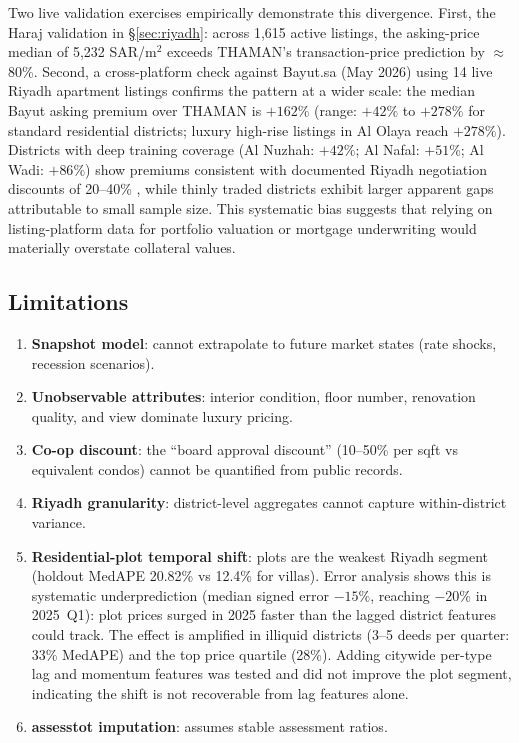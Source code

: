 \documentclass[11pt, a4paper, twoside]{article}
\begin{document}
Two live validation exercises empirically demonstrate this divergence.
First, the Haraj validation in \S\ref{sec:riyadh}: across 1,615 active
listings, the asking-price median of 5,232 SAR/m$^2$ exceeds THAMAN's
transaction-price prediction by $\approx$80\%.
Second, a cross-platform check against Bayut.sa (May 2026) using 14 live
Riyadh apartment listings confirms the pattern at a wider scale: the median
Bayut asking premium over THAMAN is $+162\%$ (range: $+42\%$ to $+278\%$
for standard residential districts; luxury high-rise listings in Al Olaya
reach $+278\%$). Districts with deep training coverage
(Al Nuzhah: $+42\%$; Al Nafal: $+51\%$; Al Wadi: $+86\%$) show premiums
consistent with documented Riyadh negotiation discounts of 20--40\%
\cite{alotaibi2021}, while thinly traded districts exhibit larger
apparent gaps attributable to small sample size.
This systematic bias suggests that relying on listing-platform data for
portfolio valuation or mortgage underwriting would materially overstate
collateral values.

\subsection{Limitations}
\begin{enumerate}
  \item \textbf{Snapshot model}: cannot extrapolate to future market states (rate shocks,
        recession scenarios).
  \item \textbf{Unobservable attributes}: interior condition, floor number, renovation
        quality, and view dominate luxury pricing.
  \item \textbf{Co-op discount}: the ``board approval discount'' (10--50\% per sqft vs
        equivalent condos) cannot be quantified from public records.
  \item \textbf{Riyadh granularity}: district-level aggregates cannot capture within-district
        variance.
  \item \textbf{Residential-plot temporal shift}: plots are the weakest Riyadh segment
        (holdout MedAPE 20.82\% vs 12.4\% for villas). Error analysis shows this is
        systematic underprediction (median signed error $-15\%$, reaching $-20\%$ in
        2025~Q1): plot prices surged in 2025 faster than the lagged district features
        could track. The effect is amplified in illiquid districts (3--5 deeds per
        quarter: 33\% MedAPE) and the top price quartile (28\%). Adding citywide
        per-type lag and momentum features was tested and did not improve the plot
        segment, indicating the shift is not recoverable from lag features alone.
  \item \textbf{assesstot imputation}: assumes stable assessment ratios.
\end{enumerate}
\end{document}

